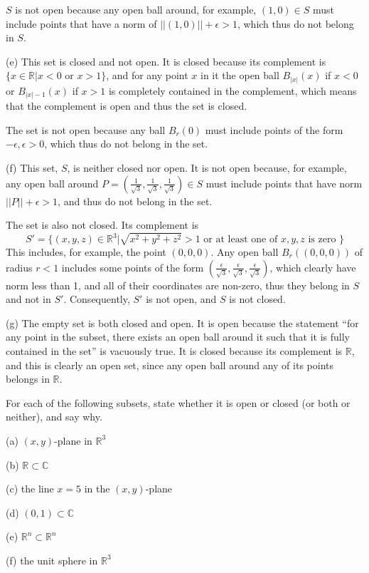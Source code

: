 \begin{solution}
    $S$ is not open because any open ball around, for example, $(1, 0) \in S$ must include points that have a norm of $\lvert \lvert (1, 0) \rvert \rvert + \epsilon > 1$, which thus do not belong in $S$.

    (e) This set is closed and not open. It is closed because its complement is $\{x \in \mathbb{R} \lvert x < 0 \text{ or } x > 1\}$, and for any point $x$ in it the open ball $B_{\lvert x \rvert}(x)$ if $x < 0$ or $B_{\lvert x \rvert - 1}(x)$ if $x > 1$ is completely contained in the complement, which means that the complement is open and thus the set is closed.

    The set is not open because any ball $B_r(0)$ must include points of the form $-\epsilon, \epsilon > 0$, which thus do not belong in the set.

    (f) This set, $S$, is neither closed nor open. It is not open because, for example, any open ball around $P = (\frac{1}{\sqrt{3}}, \frac{1}{\sqrt{3}}, \frac{1}{\sqrt{3}}) \in S$ must include points that have norm $\lvert \lvert P \rvert \rvert + \epsilon > 1$, and thus do not belong in the set.

    The set is also not closed. Its complement is 
    $$S' = \{(x, y, z) \in \mathbb{R}^3 \lvert \sqrt{x^2+y^2+z^2} > 1 \text{ or at least one of } x, y, z \text{ is zero }\}$$ This includes, for example, the point $(0, 0, 0)$. Any open ball $B_r((0, 0, 0))$ of radius $r < 1$ includes some points of the form $(\frac{\epsilon}{\sqrt{3}}, \frac{\epsilon}{\sqrt{3}}, \frac{\epsilon}{\sqrt{3}})$, which clearly have norm less than 1, and all of their coordinates are non-zero, thus they belong in $S$ and not in $S'$. Consequently, $S'$ is not open, and $S$ is not closed.

    (g) The empty set is both closed and open. It is open because the statement ``for any point in the subset, there exists an open ball around it such that it is fully contained in the set'' is vacuously true. It is closed because its complement is $\mathbb{R}$, and this is clearly an open set, since any open ball around any of its points belongs in $\mathbb{R}$.
\end{solution}

\begin{exercise}{2}
    For each of the following subsets, state whether it is open or closed (or both or neither), and say why.

    (a) $(x, y)$-plane in $\mathbb{R}^3$

    (b) $\mathbb{R} \subset \mathbb{C}$

    (c) the line $x = 5$ in the $(x, y)$-plane

    (d) $(0, 1) \subset \mathbb{C}$

    (e) $\mathbb{R}^n \subset \mathbb{R}^n$

    (f) the unit sphere in $\mathbb{R}^3$
\end{exercise}

